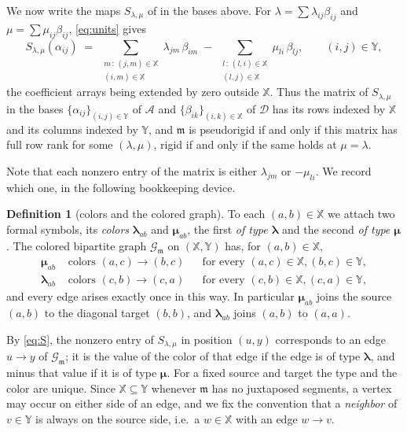 \documentclass[12pt]{article}
\def\xspace{ }%
\theoremstyle{definition}
\newtheorem{definition}[definition]{Definition}
\newcommand{\prig}{pseudorigid\xspace}
\newcommand{\mm}{\mathfrak{m}}
\newcommand{\alg}{\mathcal{A}}   %
\newcommand{\bmdl}{\mathcal{D}}   %
\newcommand{\XX}{\mathbb{X}}  %
\newcommand{\YY}{\mathbb{Y}}  %
\newcommand{\algbss}{\alpha}     %
\newcommand{\bmdlbss}{\beta}    %
\newcommand{\Sop}{S}
\newcommand{\Gc}{\mathcal{G}}          %
\newcommand{\blam}{\boldsymbol{\lambda}}   %
\newcommand{\bmu}{\boldsymbol{\mu}}        %
\begin{document}
We now write the maps $\Sop_{\lambda,\mu}$ of  in the
bases above. For $\lambda = \sum \lambda_{ij}\bmdlbss_{ij}$ and $\mu = \sum
\mu_{ij}\bmdlbss_{ij}$, \eqref{eq:units} gives
\begin{equation}\label{eq:S}
   \Sop_{\lambda,\mu}(\algbss_{ij})
   \;=\;
   \sum_{\substack{m\,:\,(j,m)\in \XX\\ (i,m)\in \XX}} \lambda_{jm}\,\bmdlbss_{im}
   \;-\;
   \sum_{\substack{l\,:\,(l,i)\in \XX\\ (l,j)\in \XX}} \mu_{li}\,\bmdlbss_{lj},
   \qquad (i,j) \in \YY ,
\end{equation}
the coefficient arrays being extended by zero outside $\XX$. Thus the
matrix of $\Sop_{\lambda,\mu}$ in the bases $\{\algbss_{ij}\}_{(i,j)\in\YY}$
of $\alg$ and $\{\bmdlbss_{ik}\}_{(i,k)\in\XX}$ of $\bmdl$ has its rows indexed by $\XX$
and its columns indexed by $\YY$, and $\mm$ is \prig if and only if
this matrix has full row rank for some $(\lambda,\mu)$, rigid if and only
if the same holds at $\mu = \lambda$.

Note that each nonzero entry of the matrix is either $\lambda_{jm}$ or
$-\mu_{li}$. We record which one, in the following bookkeeping device.

\begin{definition}[colors and the colored graph]\label{def:M}
To each $(a,b) \in \XX$ we attach two formal symbols, its \emph{colors}
$\blam_{ab}$ and $\bmu_{ab}$, the first \emph{of type $\blam$} and the
second \emph{of type $\bmu$}. The colored bipartite graph $\Gc_\mm$ on
$(\XX,\YY)$ has, for $(a,b) \in \XX$,
\begin{equation}\label{eq:type12}
\begin{aligned}
   \bmu_{ab} &\text{ colors } (a,c)\to(b,c)
   &&\text{for every } (a,c)\in\XX, (b,c) \in \YY,\\
   \blam_{ab} &\text{ colors } (c,b)\to(c,a)
   &&\text{for every } (c,b)\in\XX, (c,a) \in \YY ,
\end{aligned}
\end{equation}
and every edge arises exactly once in this way. In particular $\bmu_{ab}$
joins the source $(a,b)$ to the diagonal target $(b,b)$, and $\blam_{ab}$
joins $(a,b)$ to $(a,a)$.
\end{definition}

By \eqref{eq:S}, the nonzero entry of $\Sop_{\lambda,\mu}$ in position
$(u,y)$ corresponds to an edge $u \to y$ of $\Gc_\mm$; it is the value of
the color of that edge if the edge is of type $\blam$, and minus that
value if it is of type $\bmu$. For a fixed source and target the type and
the color are unique. Since $\XX \subseteq \YY$ whenever $\mm$ has no
juxtaposed segments, a vertex may occur on either side of an edge, and we
fix the convention that a \emph{neighbor} of $v \in \YY$ is always on the
source side, i.e.\ a $w \in \XX$ with an edge $w \to v$.
\end{document}
